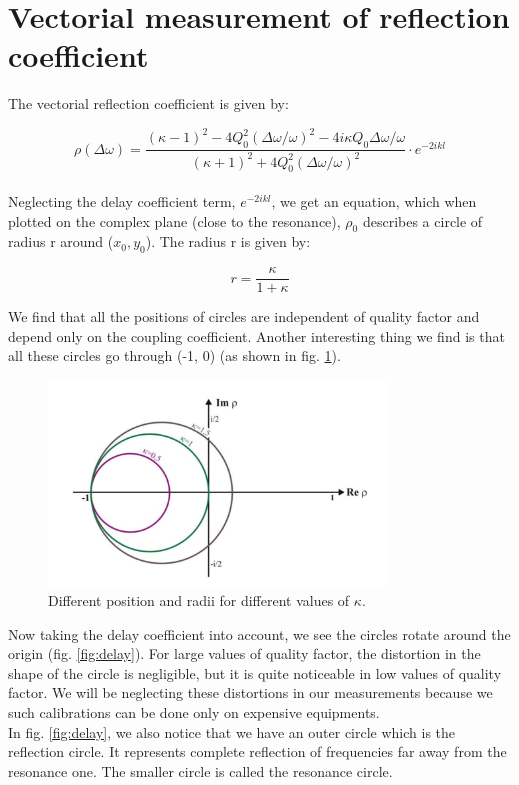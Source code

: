 \documentclass[a4paper]{article}
\numberwithin{equation}{section}
\begin{document}
\section{Vectorial measurement of reflection coefficient}
The vectorial reflection coefficient is given by: 

\begin{equation}
		\rho (\Delta \omega) = \frac{(\kappa - 1)^2 - 4Q_{0}^2 \left(\Delta \omega / \omega \right)^2 - 4i \kappa Q_{0} \Delta\omega / \omega}{(\kappa + 1)^2 + 4Q_{0}^2 \left(\Delta \omega / \omega \right)^2}  \cdot e^{-2ikl}
\end{equation}
\\
Neglecting the delay coefficient term, $e^{-2ikl}$, we get an equation, which when plotted on the complex plane (close to the resonance), $\rho_{0}$ describes a circle of radius r around ($x_{0}, y_{0}$).  The radius r is given by: 

\[
		r = \frac{\kappa}{1+ \kappa}
\]

We find that all the positions of circles are independent of quality factor and depend only on the coupling coefficient. Another interesting thing we find is that all these circles go through (-1, 0) (as shown in fig. \ref{fig:circles}). 

\begin{figure}[hbt!]
    \centering
    \includegraphics[width=0.8\textwidth]{circles}
	\caption{Different position and radii for different values of $\kappa$. \cite{Switka22}}
    \label{fig:circles}
\end{figure}

Now taking the delay coefficient into account, we see the circles rotate around the origin (fig. \ref{fig:delay}). For large values of quality factor, the distortion in the shape of the circle is negligible, but it is quite noticeable in low values of quality factor. We will be neglecting these distortions in our measurements because we such calibrations can be done only on expensive equipments. \\
In fig. \ref{fig:delay}, we also notice that we have an outer circle which is the reflection circle. It represents complete reflection of frequencies far away from the resonance one. The smaller circle is called the resonance circle. 
\end{document}
